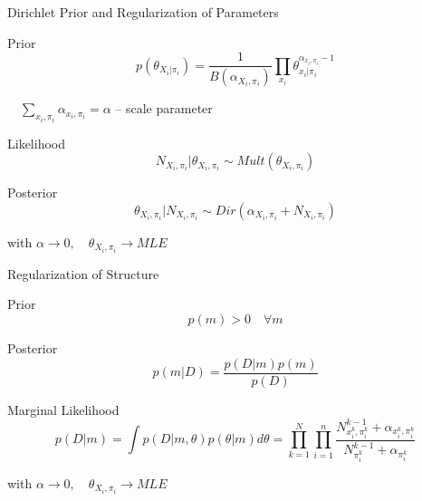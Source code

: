 \documentclass{beamer}
\begin{document}
\begin{frame}{Dirichlet Prior and Regularization of Parameters}

\begin{block}{Prior}
$$p(\theta_{X_i | \pi_i}) = \frac{1}{B(\alpha_{X_i, \pi_i})} \prod_{x_i} \theta^{\alpha_{x_i, \pi_i} - 1}_{x_i | \pi_i} $$

$\quad \sum_{x_i, \pi_i} \alpha_{x_i, \pi_i} = \alpha $ -- scale parameter
\end{block}

\begin{block}{Likelihood}
$$N_{X_i, \pi_i} | \theta_{X_i, \pi_i} \sim Mult(\theta_{X_i, \pi_i})$$
\end{block}

\begin{block}{Posterior}
$$\theta_{X_i, \pi_i} | N_{X_i, \pi_i} \sim Dir(\alpha_{X_i, \pi_i} + N_{X_i, \pi_i})$$
\end{block}


with $\alpha \to 0, \quad \theta_{X_i, \pi_i} \to MLE$

\end{frame}
\begin{frame}{Regularization of Structure}

\begin{block}{Prior}
$$p(m) > 0 \quad \forall m$$
\end{block}

\begin{block}{Posterior}
$$p(m | D) = \frac{p(D | m) p(m)}{p(D)}$$
\end{block}

\begin{block}{Marginal Likelihood}
$$p(D | m) = \int p(D | m, \theta) p(\theta | m) d\theta = \prod_{k=1}^{N} \prod_{i=1}^{n} \frac{N^{k-1}_{x_i^k, \pi_i^k} + \alpha_{x_i^k, \pi_i^k}}{N^{k-1}_{\pi_i^k} + \alpha_{\pi_i^k}} $$
\end{block}


with $\alpha \to 0, \quad \theta_{X_i, \pi_i} \to MLE$

\end{frame}
\end{document}

